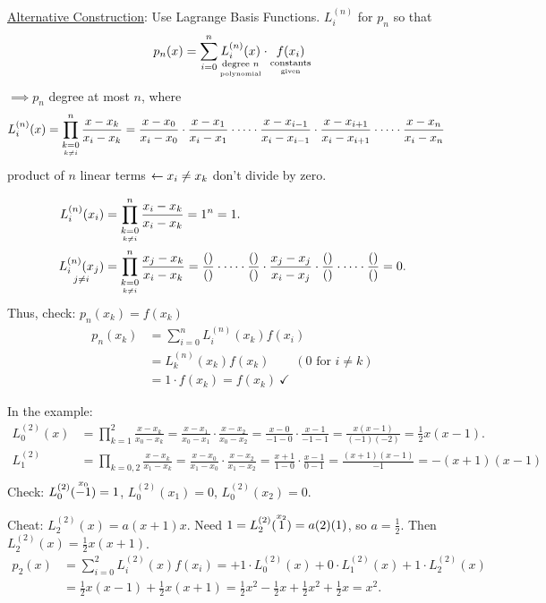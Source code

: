 \documentclass[]{article}
\begin{document}
\ul{Alternative Construction}: Use Lagrange Basis Functions.
$ L_i^{(n)}$ for $p_n$ so that $$ p_n(x) = \sum_{i=0}^n \underset{\underset{\text{polynomial}}{\text{degree }n}}{L_i^{(n)}(x)} \cdot \underset{\underset{\text{given}}{\text{constants}}}{f(x_i)} $$ $\implies p_n$ degree at most $n$,
where 
\begin{align*}
	L_i^{(n)}(x) &= \prod_{\underset{k\neq i}{k=0}}^n \frac{x-x_k}{x_i-x_k}
				 = \frac{x-x_0}{x_i-x_0}\cdot\frac{x-x_1}{x_i-x_1}\cdot \dots \cdot \frac{x-x_{i-1}}{x_i-x_{i-1}} \cdot \frac{x-x_{i+1}}{x_i-x_{i+1}} \cdot \dots \cdot \frac{x-x_n}{x_i-x_n}
\end{align*}
product of $n$ linear terms $\leftarrow x_i\neq x_k$ don't divide by zero.
\begin{observe}
	\begin{align*}
		L_i^{(n)}(x_i) &=\prod_{\underset{k\neq i}{k=0}}^n \frac{x_i-x_k}{x_i-x_k} = 1^n = 1.\\
		\underset{j\neq i}{L_i^{(n)}(x_j)} &= \prod_{\underset{k\neq i}{k=0}}^n \frac{x_j-x_k}{x_i-x_k} = \frac{()}{()} \cdot \dots \cdot \frac{()}{()} \cdot \frac{x_j-x_j}{x_i-x_j} \cdot \frac{()}{()} \cdot \dots \cdot \frac{()}{()} = 0.
	\end{align*}
	Thus, check: $p_n(x_k) = f(x_k)$
	\begin{align*}
		p_n(x_k) &= \sum_{i=0}^n L_i^{(n)} (x_k) f(x_i) \\
				 &= L_k^{(n)}(x_k) f(x_k) \qquad (0 \text{ for }i\neq k) \\
				 &= 1\cdot f(x_k)
				 = f(x_k) \ \checkmark
	\end{align*}
\end{observe}

In the example:
\begin{align*}
	L_0^{(2)}(x) &= \prod_{k=1}^2 \frac{x-x_k}{x_0-x_k} = \frac{x-x_1}{x_0-x_1}\cdot \frac{x-x_2}{x_0-x_2}
				 = \frac{x-0}{-1-0} \cdot \frac{x-1}{-1-1}
				 = \frac{x(x-1)}{(-1)(-2)} = \frac12x(x-1). \\
	L_1^{(2)} &= \prod_{k=0,2} \frac{x-x_k}{x_1-x_k}
			  = \frac{x-x_0}{x_1-x_0}\cdot \frac{x-x_2}{x_1-x_2}
			  = \frac{x+1}{1-0}\cdot \frac{x-1}{0-1}
			  = \frac{(x+1)(x-1)}{-1}
			  = -(x+1)(x-1) \\
\end{align*}
Check: $L_0^{(2)}(\overset{x_0}{-1}) = 1$, $L_0^{(2)}(x_1)=0$, $L_0^{(2)} (x_2) = 0$.

Cheat: $L_2^{(2)}(x) = a(x+1)x$. Need $1=L_2^{(2)}(\overset{x_2}{1}) = a(2)(1)$, so $a = \frac12$.
Then $L_2^{(2)}(x) = \frac12 x(x+1)$.
\begin{align*}
	p_2(x) &= \sum_{i=0}^2 L_i^{(2)}(x)f(x_i)
		   = +1 \cdot L_0^{(2)}(x) + 0\cdot L_1^{(2)}(x) + 1\cdot L_2^{(2)}(x) \\
		   &= \frac12x(x-1)+\frac12x(x+1)
		   = \frac12x^2-\frac12x + \frac12 x^2 + \frac12 x
		   = x^2.
\end{align*}
\end{document}
